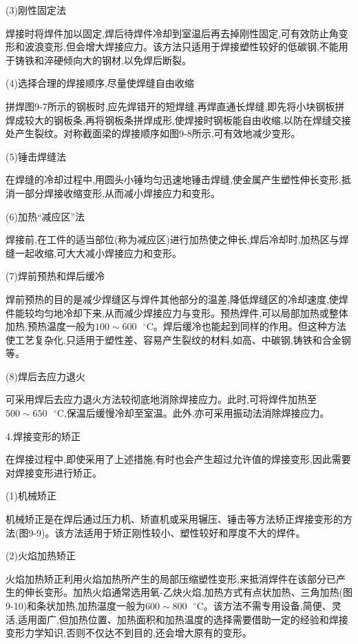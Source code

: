 \documentclass[UTF8]{ctexbook}
\newcommand{\◎}{\ensuremath{\bigcirc}}
\begin{document}
(3)刚性固定法

焊接时将焊件加以固定,焊后待焊件冷却到室温后再去掉刚性固定,可有效防止角变形和波浪变形,但会增大焊接应力。该方法只适用于焊接塑性较好的低碳钢,不能用于铸铁和淬硬倾向大的钢材,以免焊后断裂。

(4)选择合理的焊接顺序,尽量使焊缝自由收缩

拼焊图9-7所示的钢板时,应先焊错开的短焊缝,再焊直通长焊缝,即先将小块钢板拼焊成较大的钢板条,再将钢板条拼焊成形,使焊接时钢板能自由收缩,以防在焊缝交接处产生裂纹。对称截面梁的焊接顺序如图9-8所示,可有效地减少变形。

(5)锤击焊缝法

在焊缝的冷却过程中,用圆头小锤均匀迅速地锤击焊缝,使金属产生塑性伸长变形,抵消一部分焊接收缩变形,从而减小焊接应力和变形。

(6)加热“减应区”法

焊接前,在工件的适当部位(称为减应区)进行加热使之伸长,焊后冷却时,加热区与焊缝一起收缩,可大大减小焊接应力和变形。

(7)焊前预热和焊后缓冷

焊前预热的目的是减少焊缝区与焊件其他部分的温差,降低焊缝区的冷却速度,使焊件能较均匀地冷却下来,从而减少焊接应力与变形。预热焊件,可以局部加热或整体加热,预热温度一般为$100 \sim 600\text{ }^\circ\text{C}$。焊后缓冷也能起到同样的作用。但这种方法使工艺复杂化,只适用于塑性差、容易产生裂纹的材料,如高、中碳钢,铸铁和合金钢等。

(8)焊后去应力退火

可采用焊后去应力退火方法较彻底地消除焊接应力。此时,可将焊件加热至$500 \sim 650\text{ }^\circ\text{C}$,保温后缓慢冷却至室温。此外,亦可采用振动法消除焊接应力。

4.焊接变形的矫正

在焊接过程中,即使采用了上述措施,有时也会产生超过允许值的焊接变形,因此需要对焊接变形进行矫正。

(1)机械矫正

机械矫正是在焊后通过压力机、矫直机或采用辗压、锤击等方法矫正焊接变形的方法(图9-9)。该方法适用于矫正刚性较小、塑性较好和厚度不大的焊件。

(2)火焰加热矫正

火焰加热矫正利用火焰加热所产生的局部压缩塑性变形,来抵消焊件在该部分已产生的伸长变形。加热火焰通常选用氧-乙炔火焰,加热方式有点状加热、三角加热(图9-10)和条状加热,加热温度一般为$600 \sim 800\text{ }^\circ\text{C}$。该方法不需专用设备,简便、灵活,适用面广,但加热位置、加热面积和加热温度的选择需要借助一定的经验和焊接变形力学知识,否则不仅达不到目的,还会增大原有的变形。
\end{document}
